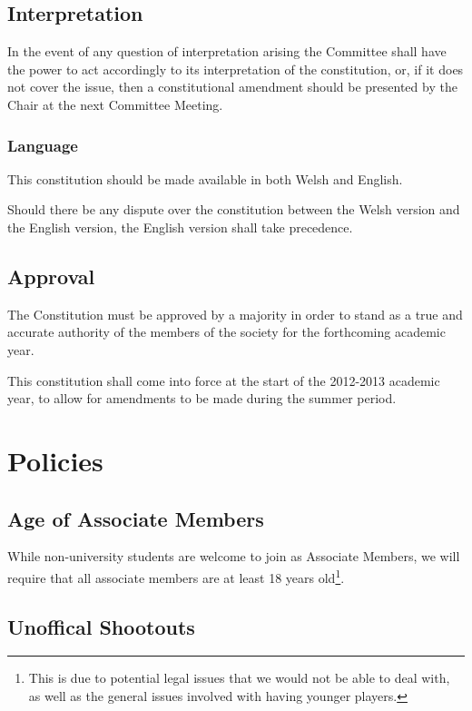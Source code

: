 \documentclass{report}
\begin{document}
\section{Interpretation}

In the event of any question of interpretation arising the Committee shall have the power to act accordingly to its interpretation of the constitution, or, if it does not cover the issue, then a constitutional amendment should be presented by the Chair at the next Committee Meeting.

	\subsection{Language}
	
	This constitution should be made available in both Welsh and English.
	
	Should there be any dispute over the constitution between the Welsh version and the English version, the English version shall take precedence.

\section{Approval}

The Constitution must be approved by a majority in order to stand as a true and accurate authority of the members of the society for the forthcoming academic year.

This constitution shall come into force at the start of the 2012-2013 academic year, to allow for amendments to be made during the summer period.

\appendix
\chapter{Policies}
\label{policy}

\section{Age of Associate Members}

While non-university students are welcome to join as Associate Members, we will require that all associate members are at least 18 years old\footnote{This is due to potential legal issues that we would not be able to deal with, as well as the general issues involved with having younger players.}.

\section{Unoffical Shootouts}
\end{document}
